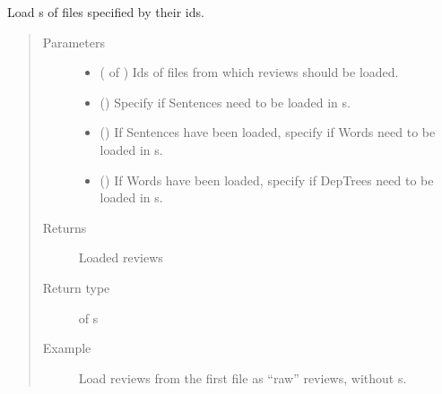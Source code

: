 \documentclass[letterpaper,10pt,english]{sphinxmanual}
\begin{document}
\begin{fulllineitems}
\label{\detokenize{load:loacore.load.review_load.load_reviews_by_id_files}}
Load  s of files specified by their ids.
\begin{quote}\begin{description}
\item[{Parameters}] \leavevmode\begin{itemize}
\item {} 
 ( of ) \textendash{} Ids of files from which reviews should be loaded.

\item {} 
 () \textendash{} Specify if Sentences need to be loaded in  s.

\item {} 
 () \textendash{} If Sentences have been loaded, specify if Words need to be loaded in  s.

\item {} 
 () \textendash{} If Words have been loaded, specify if DepTrees need to be loaded in  s.

\end{itemize}

\item[{Returns}] \leavevmode
Loaded reviews

\item[{Return type}] \leavevmode
{} of  s

\item[{Example}] \leavevmode
Load reviews from the first file as “raw” reviews, without  s.


\end{description}
\end{quote}
\end{fulllineitems}
\end{document}
